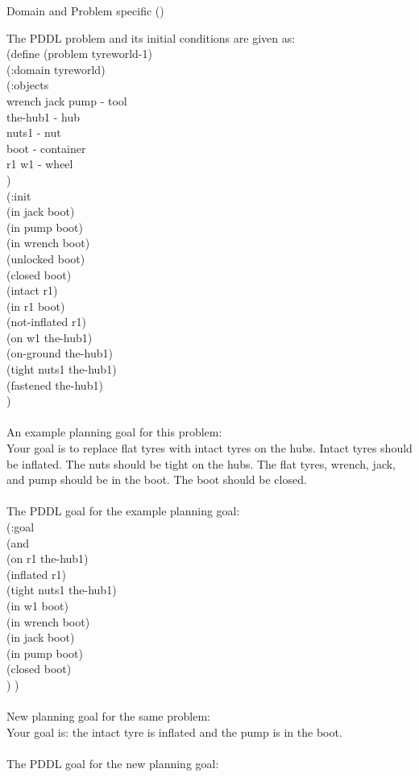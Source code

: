 \newpage
\noindent
Domain and Problem specific (\tyre) \\
\begin{tcolorbox}[redbox]
\begin{minipage}{0.95\columnwidth}
The PDDL problem and its initial conditions are given as: \\
(define (problem tyreworld-1)\\
(:domain tyreworld)\\
(:objects \\
wrench jack pump - tool\\
the-hub1 - hub\\
nuts1 - nut\\
boot - container\\
r1 w1 - wheel\\
)\\
(:init\\
(in jack boot)\\
(in pump boot)\\
(in wrench boot)\\
(unlocked boot)\\
(closed boot)\\
(intact r1)\\
(in r1 boot)\\
(not-inflated r1)\\
(on w1 the-hub1)\\
(on-ground the-hub1)\\
(tight nuts1 the-hub1)\\
(fastened the-hub1)\\
) 
\\ \\
An example planning goal for this problem:  \\
Your goal is to replace flat tyres with intact tyres on the hubs. Intact tyres should be inflated. The nuts should be tight on the hubs. The flat tyres, wrench, jack, and pump should be in the boot. The boot should be closed. 
\\ \\
The PDDL goal for the example planning goal:  \\
(:goal\\
(and\\
(on r1 the-hub1)\\
(inflated r1)\\
(tight nuts1 the-hub1)\\
(in w1 boot)\\
(in wrench boot)\\
(in jack boot)\\
(in pump boot)\\
(closed boot)\\
)
) 
\\ \\
New planning goal for the same problem:\\
 Your goal is: the intact tyre is inflated and the pump is in the boot. 
 \\ \\
The PDDL goal for the new planning goal:
\end{minipage}
\end{tcolorbox} \\ \\
